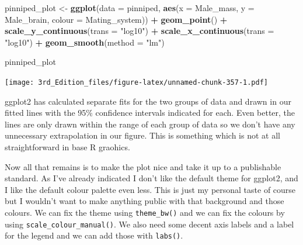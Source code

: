 \documentclass[
]{book}
\newenvironment{Shaded}{\begin{snugshade}}{\end{snugshade}}
\newcommand{\DataTypeTok}[1]{\textcolor[rgb]{0.13,0.29,0.53}{#1}}
\newcommand{\KeywordTok}[1]{\textcolor[rgb]{0.13,0.29,0.53}{\textbf{#1}}}
\newcommand{\NormalTok}[1]{#1}
\newcommand{\OperatorTok}[1]{\textcolor[rgb]{0.81,0.36,0.00}{\textbf{#1}}}
\newcommand{\StringTok}[1]{\textcolor[rgb]{0.31,0.60,0.02}{#1}}
\begin{document}
\begin{Shaded}
\begin{Highlighting}[]

\NormalTok{pinniped_plot <-}\StringTok{ }\KeywordTok{ggplot}\NormalTok{(}\DataTypeTok{data =}\NormalTok{ pinniped, }\KeywordTok{aes}\NormalTok{(}\DataTypeTok{x =}\NormalTok{ Male_mass, }\DataTypeTok{y =}\NormalTok{ Male_brain, }\DataTypeTok{colour =}\NormalTok{ Mating_system)) }\OperatorTok{+}
\StringTok{        }\KeywordTok{geom_point}\NormalTok{() }\OperatorTok{+}\StringTok{ }
\StringTok{        }\KeywordTok{scale_y_continuous}\NormalTok{(}\DataTypeTok{trans =} \StringTok{"log10"}\NormalTok{) }\OperatorTok{+}
\StringTok{        }\KeywordTok{scale_x_continuous}\NormalTok{(}\DataTypeTok{trans =} \StringTok{"log10"}\NormalTok{) }\OperatorTok{+}
\StringTok{        }\KeywordTok{geom_smooth}\NormalTok{(}\DataTypeTok{method =} \StringTok{"lm"}\NormalTok{)}

\NormalTok{pinniped_plot}
\end{Highlighting}
\end{Shaded}

\texttt{[image: 3rd\_Edition\_files/figure-latex/unnamed-chunk-357-1.pdf]}

ggplot2 has calculated separate fits for the two groups of data and drawn in our fitted lines with the 95\% confidence intervals indicated for each. Even better, the lines are only drawn within the range of each group of data so we don't have any unnecessary extrapolation in our figure. This is something which is not at all straightforward in base R graohics.

Now all that remains is to make the plot nice and take it up to a publishable standard. As I've already indicated I don't like the default theme for ggplot2, and I like the default colour palette even less. This is just my personal taste of course but I wouldn't want to make anything public with that background and those colours. We can fix the theme using \texttt{theme\_bw()} and we can fix the colours by using \texttt{scale\_colour\_manual()}. We also need some decent axis labels and a label for the legend and we can add those with \texttt{labs()}.
\end{document}
